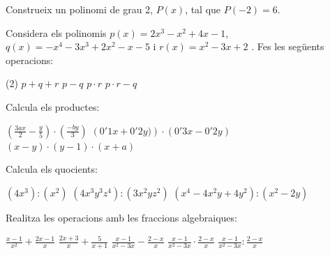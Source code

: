 \begin{activitats}
\begin{mylist}

\exer  Construeix un polinomi de grau 2, $P(x)$, tal que $P(-2)=6$.


\exer  Considera els polinomis $p(x)=2x^{3} -x^{2} +4x-1$, $q(x)=-x^{4} -3x^{3} +2x^{2} -x-5$ i $r(x)=x^{2} -3x+2$ . Fes les següents operacions:  

\begin{tasks}(2)
	\task  $p+q+r$   
	\task $p-q$   
	\task $p\cdot r$   
	\task $p\cdot r-q$
\end{tasks}


\pagebreak
\exer  Calcula els productes:

\begin{tasks}
	\task  $\left(\frac{3ax}{2} -\frac{y}{5} \right)\cdot \left(\frac{-by}{3} \right)$  
	\task  $\left(0'1x+0'2y)\right)\cdot \left(0'3x-0'2y\right)$  
	\task  $\left(x-y\right)\cdot \left(y-1\right)\cdot \left(x+a\right)$
\end{tasks}


\exer  Calcula els quocients: 
\begin{tasks}
	\task  $(4x^{3} ):(x^{2} )$ 
	\task  $\left(4x^{3} y^{3} z^{4} \right):\left(3x^{2} yz^{2} \right)$  
	\task  $\left(x^{4} -4x^{2} y+4y^{2} \right):\left(x^{2} -2y\right)$
\end{tasks}

\answers[cols=2]{[$4x$, $\frac{4}{3}xy^2 z^2$, $x^2-2y$]}

\exer  Realitza les operacions amb les fraccions algebraiques:  

\begin{tasks}
	\task  $\frac{x-1}{x^{2} } +\frac{2x-1}{x} $  
	\task  $\frac{2x+3}{x} +\frac{5}{x+1} $  
	\task $\frac{x-1}{x^{2} -3x} -\frac{2-x}{x} $
	\task $\frac{x-1}{x^{2} -3x} \cdot \frac{2-x}{x} $  
	\task $\frac{x-1}{x^{2} -3x} :\frac{2-x}{x} $
\end{tasks}


\end{mylist}
\end{activitats}
